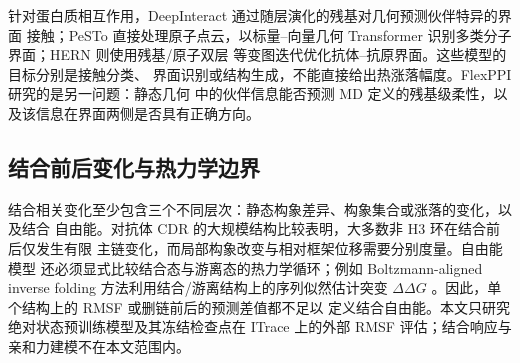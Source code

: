 针对蛋白质相互作用，DeepInteract 通过随层演化的残基对几何预测伙伴特异的界面
接触\cite{morehead2022deepinteract}；PeSTo 直接处理原子点云，以标量--向量几何
Transformer 识别多类分子界面\cite{krapp2023pesto}；HERN 则使用残基/原子双层
等变图迭代优化抗体--抗原界面\cite{jin2022hern}。这些模型的目标分别是接触分类、
界面识别或结构生成，不能直接给出热涨落幅度。FlexPPI 研究的是另一问题：静态几何
中的伙伴信息能否预测 MD 定义的残基级柔性，以及该信息在界面两侧是否具有正确方向。

\subsection{结合前后变化与热力学边界}

结合相关变化至少包含三个不同层次：静态构象差异、构象集合或涨落的变化，以及结合
自由能。对抗体 CDR 的大规模结构比较表明，大多数非 H3 环在结合前后仅发生有限
主链变化，而局部构象改变与相对框架位移需要分别度量\cite{liu2024cdr}。自由能模型
还必须显式比较结合态与游离态的热力学循环；例如 Boltzmann-aligned inverse folding
方法利用结合/游离结构上的序列似然估计突变 $\Delta\Delta G$
\cite{jiao2024boltzmann}。因此，单个结构上的 RMSF 或删链前后的预测差值都不足以
定义结合自由能。本文只研究绝对状态预训练模型及其冻结检查点在 ITrace 上的外部
RMSF 评估；结合响应与亲和力建模不在本文范围内。

